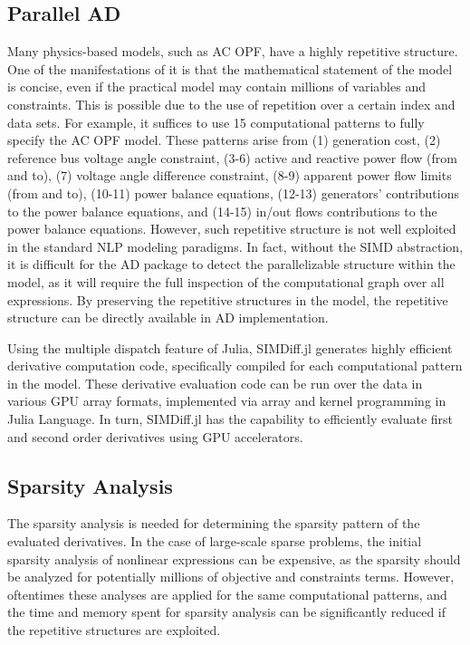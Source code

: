 \subsection{Parallel AD}
\label{sec:simd:ad}
Many physics-based models, such as AC OPF, have a highly repetitive
structure. One of the manifestations of it is that the mathematical
statement of the model is concise, even if the practical model may contain
millions of variables and constraints. This is possible due to the use of
repetition over a certain index and data sets. For example,
it suffices to use 15 computational patterns to fully specify the
AC OPF model. These patterns arise from (1) generation cost, (2) reference
bus voltage angle constraint, (3-6) active and reactive power flow (from and to),
(7) voltage angle difference constraint, (8-9) apparent
power flow limits (from and to), (10-11) power balance equations,
(12-13) generators' contributions to the power balance equations, and
(14-15) in/out flows contributions to the power balance
equations. However, such repetitive structure is not well exploited in
the standard NLP modeling paradigms. In fact, without the SIMD
abstraction, it is difficult for the AD package to detect the
parallelizable structure within the model, as it will require the full
inspection of the computational graph over all expressions.  By
preserving the repetitive structures in the model, the repetitive
structure can be directly available in AD implementation.

Using the multiple dispatch feature of Julia, SIMDiff.jl generates
highly efficient derivative computation code, specifically compiled
for each computational pattern in the model. These derivative
evaluation code can be run over the data in various GPU array formats,
implemented via array and kernel programming in Julia Language. In
turn, SIMDiff.jl has the capability to efficiently evaluate first and
second order derivatives using GPU accelerators.

\subsection{Sparsity Analysis}
The sparsity analysis is needed for determining the sparsity pattern
of the evaluated derivatives. In the case of large-scale sparse
problems, the initial sparsity analysis of nonlinear expressions can
be expensive, as the sparsity should be analyzed for potentially
millions of objective and constraints terms. However, oftentimes
these analyses are applied for the same computational patterns, and
the time and memory spent for sparsity analysis can be significantly
reduced if the repetitive structures are exploited.

